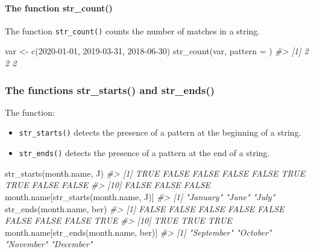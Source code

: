 \documentclass[
]{book}
\newenvironment{Shaded}{\begin{snugshade}}{\end{snugshade}}
\newcommand{\AttributeTok}[1]{\textcolor[rgb]{0.77,0.63,0.00}{#1}}
\newcommand{\CommentTok}[1]{\textcolor[rgb]{0.56,0.35,0.01}{\textit{#1}}}
\newcommand{\FunctionTok}[1]{\textcolor[rgb]{0.00,0.00,0.00}{#1}}
\newcommand{\NormalTok}[1]{#1}
\newcommand{\OtherTok}[1]{\textcolor[rgb]{0.56,0.35,0.01}{#1}}
\newcommand{\StringTok}[1]{\textcolor[rgb]{0.31,0.60,0.02}{#1}}
\providecommand{\tightlist}{%
  \setlength{\itemsep}{0pt}\setlength{\parskip}{0pt}}
\begin{document}
\hypertarget{the-function-str_count}{%
\paragraph{The function str\_count()}\label{the-function-str_count}}

The function \texttt{str\_count()} counts the number of matches in a string.

\begin{Shaded}
\begin{Highlighting}[]
\NormalTok{var }\OtherTok{\textless{}{-}} \FunctionTok{c}\NormalTok{(}\StringTok{\textquotesingle{}2020{-}01{-}01\textquotesingle{}}\NormalTok{, }\StringTok{\textquotesingle{}2019{-}03{-}31\textquotesingle{}}\NormalTok{, }\StringTok{\textquotesingle{}2018{-}06{-}30\textquotesingle{}}\NormalTok{)}
\FunctionTok{str\_count}\NormalTok{(var, }\AttributeTok{pattern =} \StringTok{\textquotesingle{}{-}\textquotesingle{}}\NormalTok{)}
\CommentTok{\#\textgreater{} [1] 2 2 2}
\end{Highlighting}
\end{Shaded}

\hypertarget{the-functions-str_starts-and-str_ends}{%
\subsubsection{The functions str\_starts() and str\_ends()}\label{the-functions-str_starts-and-str_ends}}

The function:

\begin{itemize}
\tightlist
\item
  \texttt{str\_starts()} detects the presence of a pattern at the beginning of a string.
\item
  \texttt{str\_ends()} detects the presence of a pattern at the end of a string.
\end{itemize}

\begin{Shaded}
\begin{Highlighting}[]
\FunctionTok{str\_starts}\NormalTok{(month.name, }\StringTok{\textquotesingle{}J\textquotesingle{}}\NormalTok{)}
\CommentTok{\#\textgreater{}  [1]  TRUE FALSE FALSE FALSE FALSE  TRUE  TRUE FALSE FALSE}
\CommentTok{\#\textgreater{} [10] FALSE FALSE FALSE}
\NormalTok{month.name[}\FunctionTok{str\_starts}\NormalTok{(month.name, }\StringTok{\textquotesingle{}J\textquotesingle{}}\NormalTok{)]}
\CommentTok{\#\textgreater{} [1] "January" "June"    "July"}
\FunctionTok{str\_ends}\NormalTok{(month.name, }\StringTok{\textquotesingle{}ber\textquotesingle{}}\NormalTok{)}
\CommentTok{\#\textgreater{}  [1] FALSE FALSE FALSE FALSE FALSE FALSE FALSE FALSE  TRUE}
\CommentTok{\#\textgreater{} [10]  TRUE  TRUE  TRUE}
\NormalTok{month.name[}\FunctionTok{str\_ends}\NormalTok{(month.name, }\StringTok{\textquotesingle{}ber\textquotesingle{}}\NormalTok{)]}
\CommentTok{\#\textgreater{} [1] "September" "October"   "November"  "December"}
\end{Highlighting}
\end{Shaded}
\end{document}
